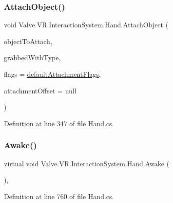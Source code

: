 \subsubsection{\texorpdfstring{AttachObject()}{AttachObject()}}
{\footnotesize\ttfamily void Valve.\+V\+R.\+Interaction\+System.\+Hand.\+Attach\+Object (\begin{DoxyParamCaption}\item[{Game\+Object}]{object\+To\+Attach,  }\item[{\mbox{\hyperlink{namespace_valve_1_1_v_r_1_1_interaction_system_ae03ab84d315f5997fd000817bfb96a0f}{Grab\+Types}}}]{grabbed\+With\+Type,  }\item[{\mbox{\hyperlink{class_valve_1_1_v_r_1_1_interaction_system_1_1_hand_a61701f82b8f3fac8818954ec71804cb5}{Attachment\+Flags}}}]{flags = {\ttfamily \mbox{\hyperlink{class_valve_1_1_v_r_1_1_interaction_system_1_1_hand_a836a6cb55d2514dbed680981dfcc5505}{default\+Attachment\+Flags}}},  }\item[{Transform}]{attachment\+Offset = {\ttfamily null} }\end{DoxyParamCaption})}



Definition at line 347 of file Hand.\+cs.

\mbox{\label{class_valve_1_1_v_r_1_1_interaction_system_1_1_hand_abe0894861fa946c40c4d22508043e2e8}} 
\subsubsection{\texorpdfstring{Awake()}{Awake()}}
{\footnotesize\ttfamily virtual void Valve.\+V\+R.\+Interaction\+System.\+Hand.\+Awake (\begin{DoxyParamCaption}{ }\end{DoxyParamCaption})\hspace{0.3cm}{\ttfamily [protected]}, {\ttfamily [virtual]}}



Definition at line 760 of file Hand.\+cs.

\mbox{\label{class_valve_1_1_v_r_1_1_interaction_system_1_1_hand_ac17817bbf5f05013c7bda03762588c2e}} 
